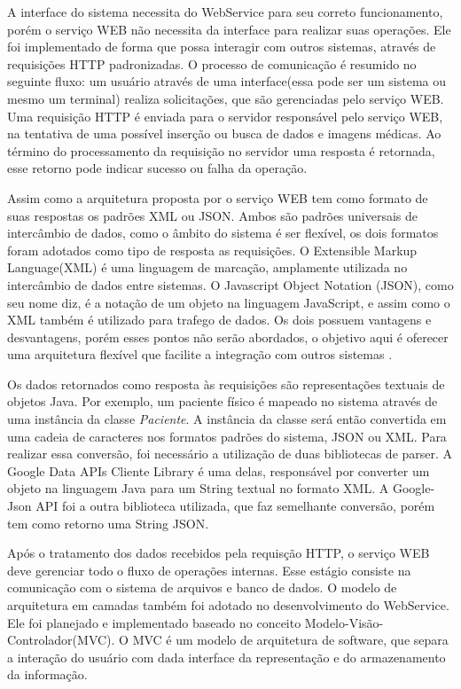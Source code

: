 A interface do sistema necessita do WebService para seu correto funcionamento, porém o serviço WEB não necessita da interface para realizar suas operações. Ele foi implementado de forma que possa interagir com outros sistemas, através de requisições HTTP padronizadas.
O processo de comunicação é resumido no seguinte fluxo: um usuário através de uma interface(essa pode ser um sistema ou mesmo um terminal) realiza solicitações, que são gerenciadas pelo serviço WEB.
Uma requisição HTTP é enviada para o servidor responsável pelo serviço WEB, na tentativa de uma possível inserção ou busca de dados e imagens médicas.
Ao término do processamento da requisição no servidor uma resposta é retornada, esse retorno pode indicar sucesso ou falha da operação.

Assim como a arquitetura proposta por \cite{REF10} o serviço WEB tem como formato de suas respostas os padrões XML ou JSON.
Ambos são padrões universais de intercâmbio de dados, como o âmbito do sistema é ser flexível, os dois formatos foram adotados como tipo de resposta as requisições.
O Extensible Markup Language(XML) é uma linguagem de marcação, amplamente utilizada no intercâmbio de dados entre sistemas.
O Javascript Object Notation (JSON), como seu nome diz, é a notação de um objeto na linguagem JavaScript, e assim como o XML também é utilizado para trafego de dados.
Os dois possuem vantagens e desvantagens, porém esses pontos não serão abordados, o objetivo aqui é oferecer uma arquitetura flexível que facilite a integração com outros sistemas \cite{REF18}.

Os dados retornados como resposta às requisições são representações textuais de objetos Java.
Por exemplo, um paciente físico é mapeado no sistema através de uma instância da classe \textit{Paciente}.
A instância da classe será então convertida em uma cadeia de caracteres nos formatos padrões do sistema, JSON ou XML.
Para realizar essa conversão, foi necessário a utilização de duas bibliotecas de parser.
A Google Data APIs Cliente Library é uma delas, responsável por converter um objeto na linguagem Java para um String textual no formato XML.
A Google-Json API foi a outra biblioteca utilizada, que faz semelhante conversão, porém tem como retorno uma String JSON.

Após o tratamento dos dados recebidos pela requisção HTTP, o serviço WEB deve gerenciar todo o fluxo de operações internas. Esse estágio consiste na comunicação com o sistema de arquivos e banco de dados.
O modelo de arquitetura em camadas também foi adotado no desenvolvimento do WebService. Ele foi planejado e implementado baseado no conceito Modelo-Visão-Controlador(MVC).
O MVC é um modelo de arquitetura de software, que separa a interação do usuário com dada interface da representação e do armazenamento da informação.

